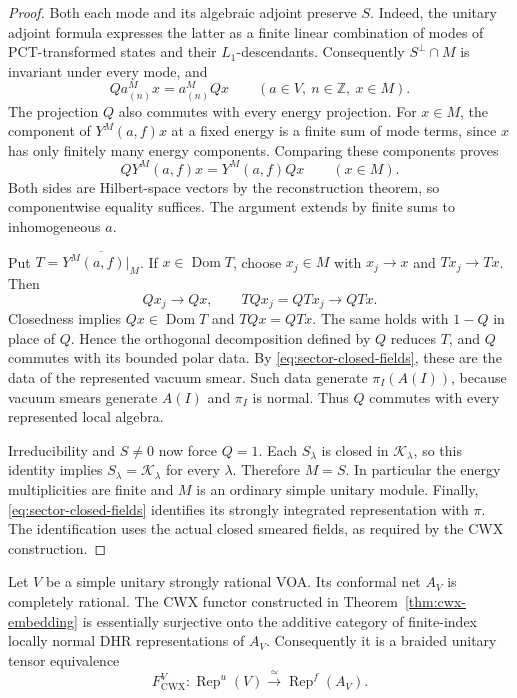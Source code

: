 \begin{proof}
Both each mode and its algebraic adjoint preserve \(S\).  Indeed, the
unitary adjoint formula expresses the latter as a finite linear combination
of modes of PCT-transformed states and their \(L_1\)-descendants.
Consequently \(S^\perp\cap M\) is invariant under every mode, and
\[
  Q a_{(n)}^M x=a_{(n)}^M Qx
       \qquad(a\in V,\ n\in\mathbb Z,\ x\in M).
\]
The projection \(Q\) also commutes with every energy projection.  For
\(x\in M\), the component of \(Y^M(a,f)x\) at a fixed energy is a
finite sum of mode terms, since \(x\) has only finitely many energy
components.  Comparing these components proves
\[
   QY^M(a,f)x=Y^M(a,f)Qx\qquad(x\in M).
\]
Both sides are Hilbert-space vectors by the reconstruction theorem, so
componentwise equality suffices.  The argument extends by finite sums to
inhomogeneous \(a\).

Put \(T=\overline{Y^M(a,f)|_M}\).  If \(x\in\operatorname{Dom}T\),
choose \(x_j\in M\) with \(x_j\to x\) and \(Tx_j\to Tx\).
Then
\[
   Qx_j\longrightarrow Qx,
   \qquad TQx_j=QTx_j\longrightarrow QTx.
\]
Closedness implies \(Qx\in\operatorname{Dom}T\) and \(TQx=QTx\).
The same holds with \(1-Q\) in place of \(Q\).  Hence the orthogonal
decomposition defined by \(Q\) reduces \(T\), and \(Q\) commutes with
its bounded polar data.  By \eqref{eq:sector-closed-fields}, these are the
data of the represented vacuum smear.  Such data generate
\(\pi_I(A(I))\), because vacuum smears generate \(A(I)\) and
\(\pi_I\) is normal.  Thus \(Q\) commutes with every represented local
algebra.

Irreducibility and \(S\ne0\) now force \(Q=1\).  Each \(S_\lambda\)
is closed in \(\mathcal K_\lambda\), so this identity implies
\(S_\lambda=\mathcal K_\lambda\) for every \(\lambda\).  Therefore
\(M=S\).  In particular the energy multiplicities are finite and
\(M\) is an ordinary simple unitary module.  Finally,
\eqref{eq:sector-closed-fields} identifies its strongly integrated
representation with \(\pi\).  The identification uses the actual closed
smeared fields, as required by the CWX construction.
\end{proof}

\begin{theorem}\label{thm:rationality}
Let \(V\) be a simple unitary strongly rational VOA.  Its conformal net
\(A_V\) is completely rational.  The CWX functor constructed in
Theorem~\ref{thm:cwx-embedding} is essentially surjective onto the
additive category of finite-index locally normal DHR representations of
\(A_V\).  Consequently it is a braided unitary tensor equivalence
\[
  F^V_{\mathrm{CWX}}:
  \operatorname{Rep}^{u}(V)\xrightarrow{\ \simeq\ }
  \operatorname{Rep}^{f}(A_V).
\]
\end{theorem}

